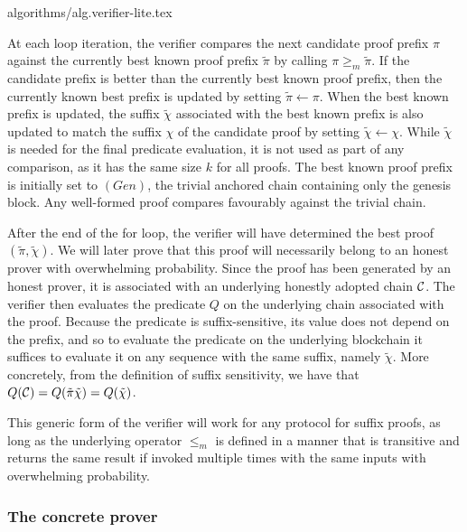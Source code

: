 {algorithms/alg.verifier-lite.tex}

At each loop iteration, the verifier compares the next candidate proof prefix
$\pi$ against the currently best known proof prefix $\tilde\pi$ by calling $\pi
\geq_m \tilde\pi$. If the candidate prefix is better than the currently best
known proof prefix, then the currently known best prefix is updated by setting
$\tilde\pi \leftarrow \pi$. When the best known prefix is updated, the suffix
$\tilde\chi$ associated with the best known prefix is also updated to match the
suffix $\chi$ of the candidate proof by setting $\tilde\chi \leftarrow \chi$.
While $\tilde\chi$ is needed for the final predicate evaluation, it is not used
as part of any comparison, as it has the same size $k$ for all proofs. The best
known proof prefix is initially set to $(Gen)$, the trivial anchored chain
containing only the genesis block. Any well-formed proof compares favourably
against the trivial chain.

After the end of the for loop, the verifier will have determined the best proof
$(\tilde\pi, \tilde\chi)$. We will later prove that this proof will necessarily
belong to an honest prover with overwhelming probability. Since the proof has
been generated by an honest prover, it is associated with an underlying honestly
adopted chain $\mathcal{C}$. The verifier then evaluates the predicate $Q$ on the
underlying chain associated with the proof. Because the predicate is
suffix-sensitive, its value does not depend on the prefix, and so to evaluate
the predicate on the underlying blockchain it suffices to evaluate it on any
sequence with the same suffix, namely $\tilde\chi$. More concretely, from the
definition of suffix sensitivity, we have that $Q(\mathcal{C}) = Q(\tilde\pi\tilde\chi) = Q(\tilde\chi)$.

This generic form of the verifier will work for any protocol for suffix proofs,
as long as the underlying operator $\leq_m$ is defined in a manner that is
transitive and returns the same result if invoked multiple times with the same
inputs with overwhelming probability.

\subsubsection{The concrete prover}


